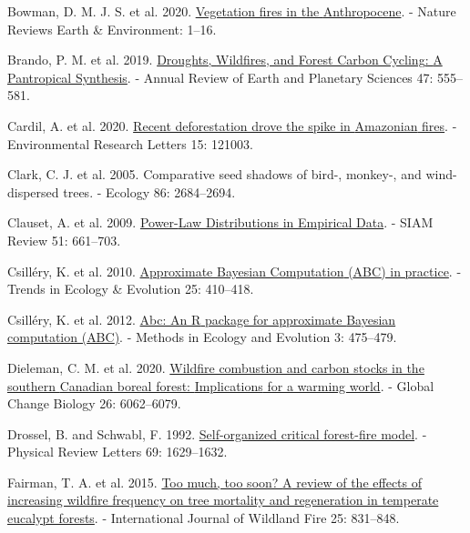 \documentclass[
]{article}
\newlength{\cslhangindent}
\newenvironment{CSLReferences}[2] %
 {\begin{list}{}{%
  \setlength{\itemindent}{0pt}
  \setlength{\leftmargin}{0pt}
  \setlength{\parsep}{0pt}
  \ifodd #1
   \setlength{\leftmargin}{\cslhangindent}
   \setlength{\itemindent}{-1\cslhangindent}
  \fi
  \setlength{\itemsep}{#2\baselineskip}}}
 {\end{list}}
\begin{document}
\begin{CSLReferences}{1}{1}
Bowman, D. M. J. S. et al. 2020.
\href{https://doi.org/10.1038/s43017-020-0085-3}{Vegetation fires in the
{Anthropocene}}. - Nature Reviews Earth \& Environment: 1--16.

Brando, P. M. et al. 2019.
\href{https://doi.org/10.1146/annurev-earth-082517-010235}{Droughts,
{Wildfires}, and {Forest Carbon Cycling}: {A Pantropical Synthesis}}. -
Annual Review of Earth and Planetary Sciences 47: 555--581.

Cardil, A. et al. 2020.
\href{https://doi.org/10.1088/1748-9326/abcac7}{Recent deforestation
drove the spike in {Amazonian} fires}. - Environmental Research Letters
15: 121003.

Clark, C. J. et al. 2005. Comparative seed shadows of bird-, monkey-,
and wind-dispersed trees. - Ecology 86: 2684--2694.

Clauset, A. et al. 2009.
\href{https://doi.org/10.1137/070710111}{Power-{Law Distributions} in
{Empirical Data}}. - SIAM Review 51: 661--703.

Csilléry, K. et al. 2010.
\href{http://dx.doi.org/10.1016/j.tree.2010.04.001}{Approximate
{Bayesian Computation} ({ABC}) in practice}. - Trends in Ecology \&
Evolution 25: 410--418.

Csilléry, K. et al. 2012.
\href{https://doi.org/10.1111/j.2041-210X.2011.00179.x}{Abc: An {R}
package for approximate {Bayesian} computation ({ABC})}. - Methods in
Ecology and Evolution 3: 475--479.

Dieleman, C. M. et al. 2020.
\href{https://doi.org/10.1111/gcb.15158}{Wildfire combustion and carbon
stocks in the southern {Canadian} boreal forest: {Implications} for a
warming world}. - Global Change Biology 26: 6062--6079.

Drossel, B. and Schwabl, F. 1992.
\href{https://doi.org/10.1103/PhysRevLett.69.1629}{Self-organized
critical forest-fire model}. - Physical Review Letters 69: 1629--1632.

Fairman, T. A. et al. 2015. \href{https://doi.org/10.1071/WF15010}{Too
much, too soon? {A} review of the effects of increasing wildfire
frequency on tree mortality and regeneration in temperate eucalypt
forests}. - International Journal of Wildland Fire 25: 831--848.


\end{CSLReferences}
\end{document}
